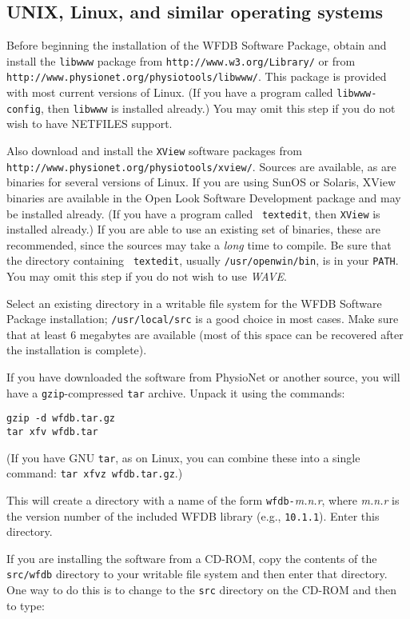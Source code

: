 \documentclass[twoside]{article}
\begin{document}
\subsection*{UNIX, Linux, and similar operating systems}

Before beginning the installation of the WFDB Software Package, obtain and
install the {\tt libwww} package from {\tt http://www.w3.org/Library/} or
from {\tt http://\-www.physio\-net.org/physio\-tools/libwww/}.  This package is
provided with most current versions of Linux.  (If you have a program called
{\tt libwww-config}, then {\tt libwww} is installed already.)  You may
omit this step if you do not wish to have NETFILES support.

Also download and install the {\tt XView} software packages from {\tt
http://www.\-physio\-net.org/\-physio\-tools/xview/}.  Sources are available,
as are binaries for several versions of Linux.  If you are using SunOS or
Solaris, XView binaries are available in the Open Look Software Development
package and may be installed already.  (If you have a program called {\tt
textedit}, then {\tt XView} is installed already.) If you are able to use an
existing set of binaries, these are recommended, since the sources may take a
{\em long} time to compile.  Be sure that the directory containing {\tt
textedit}, usually {\tt /usr/openwin/bin}, is in your {\tt PATH}.  You may omit
this step if you do not wish to use {\em WAVE}.

Select an existing directory in a writable file system for the WFDB Software
Package installation; {\tt /usr/local/src} is a good choice in most cases.
Make sure that at least 6 megabytes are available (most of this space can be
recovered after the installation is complete).

If you have downloaded the software from PhysioNet or another source, you
will have a {\tt gzip}-compressed {\tt tar} archive.  Unpack it using
the commands:

\begin{verbatim}
gzip -d wfdb.tar.gz
tar xfv wfdb.tar
\end{verbatim}

(If you have GNU {\tt tar}, as on Linux, you can combine these into a
single command: {\tt tar xfvz wfdb.tar.gz}.)

This will create a directory with a name of the form {\tt wfdb-}{\em m.n.r},
where {\em m.n.r} is the version number of the included WFDB library (e.g.,
{\tt 10.1.1}).  Enter this directory.

If you are installing the software from a CD-ROM, copy the contents of the
{\tt src/wfdb} directory to your writable file system and then enter that
directory.  One way to do this is to change to the {\tt src} directory on the
CD-ROM and then to type:
\end{document}
